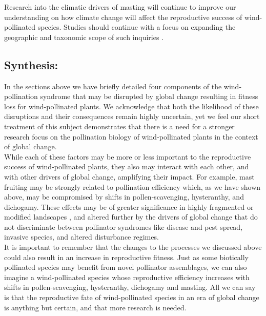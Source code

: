 \documentclass[11pt]{article}
\begin{document}
 Research into the climatic drivers of masting will continue to improve our understanding on how climate change will affect the reproductive success of wind-pollinated species. Studies should continue with a focus on expanding the geographic and taxonomic scope of such inquiries \citep{Pearse:2020aa}.

\subsection*{Synthesis:} In the sections above we have briefly detailed four components of the wind-pollination syndrome that may be disrupted by global change resulting in fitness loss for wind-pollinated plants. We acknowledge that both the likelihood of these disruptions and their consequences remain highly uncertain, yet we feel our short treatment of this subject demonstrates that there is a need for a stronger research focus on the pollination biology of wind-pollinated plants in the context of global change. \\

\noindent While each of these factors may be more or less important to the reproductive success of wind-pollinated plants, they also may interact with each other, and with other drivers of global change, amplifying their impact. For example, mast fruiting may be strongly related to pollination efficiency \citep{Sork:1993aa} which, as we have shown above, may be compromised by shifts in pollen-scavenging, hysteranthy, and dichogamy. These effects may be of greater significance in highly fragmented or modified landscapes \citep{Koenig:2003aa}, and altered further by the drivers of global change that do not discriminate between pollinator syndromes like  disease and pest spread, invasive species, and altered disturbance regimes.\\

\noindent It is important to remember that the changes to the processes we discussed above could also result in an increase in reproductive fitness. Just as some biotically pollinated species may benefit from novel pollinator assemblages, we can also imagine a wind-pollinated species whose reproductive efficiency increases with shifts in pollen-scavenging, hysteranthy, dichogamy and masting. All we can say is that the reproductive fate of wind-pollinated species in an era of global change is anything but certain, and that more research is needed.\\

 
\end{document}
